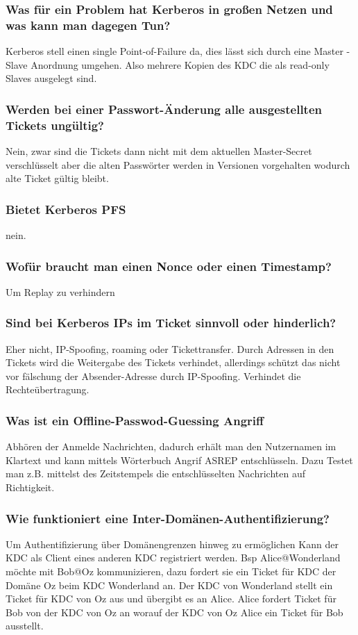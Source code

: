 	\subsubsection{Was für ein Problem hat Kerberos in großen Netzen und was kann man dagegen Tun?}
	Kerberos stell einen single Point-of-Failure da, dies lässt sich durch eine Master - Slave Anordnung umgehen. Also mehrere Kopien des KDC die als read-only Slaves ausgelegt sind.
	
	\subsubsection{Werden bei einer Passwort-Änderung alle ausgestellten Tickets ungültig?}
	Nein, zwar sind die Tickets dann nicht mit dem aktuellen Master-Secret verschlüsselt aber die alten Passwörter werden in Versionen vorgehalten wodurch alte Ticket gültig bleibt.

	\subsubsection{Bietet Kerberos PFS}
	nein.
	
	\subsubsection{Wofür braucht man einen Nonce oder einen Timestamp?}
	Um Replay zu verhindern
	
	\subsubsection{Sind bei Kerberos IPs im Ticket sinnvoll oder hinderlich?}
	Eher nicht, IP-Spoofing, roaming oder Tickettransfer.
	Durch Adressen in den Tickets wird die Weitergabe des Tickets verhindet, allerdings schützt das nicht vor fälschung der Absender-Adresse durch IP-Spoofing. Verhindet die Rechteübertragung.
	
	\subsubsection{Was ist ein Offline-Passwod-Guessing Angriff}
	Abhören der Anmelde Nachrichten, dadurch erhält man den Nutzernamen im Klartext und kann mittels Wörterbuch Angrif AS\textunderscore REP entschlüsseln. Dazu Testet man z.B. mittelst des Zeitstempels die entschlüsselten Nachrichten auf Richtigkeit. 
	
	\subsubsection{Wie funktioniert eine Inter-Domänen-Authentifizierung?}
	Um Authentifizierung über Domänengrenzen hinweg zu ermöglichen Kann der KDC als Client eines anderen KDC registriert werden. Bsp Alice@Wonderland möchte mit Bob@Oz kommunizieren, dazu fordert sie ein Ticket für KDC der Domäne Oz beim KDC Wonderland an. Der KDC von Wonderland stellt ein Ticket für KDC von Oz aus und übergibt es an Alice. Alice fordert Ticket für Bob von der KDC von Oz an worauf der KDC von Oz Alice ein Ticket für Bob ausstellt.
	
